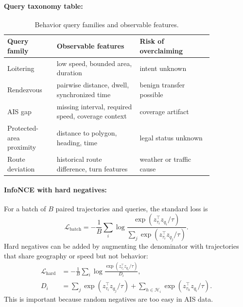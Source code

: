 \documentclass{article}
\begin{document}
\paragraph{Query taxonomy table:}

\begin{table}[t]
\centering
\caption{Behavior query families and observable features.}
\begin{tabular}{@{}p{0.20\linewidth}p{0.34\linewidth}p{0.30\linewidth}@{}}
\toprule
\textbf{Query family} & \textbf{Observable features} & \textbf{Risk of overclaiming}\\
\midrule
Loitering & low speed, bounded area, duration & intent unknown\\
Rendezvous & pairwise distance, dwell, synchronized time & benign transfer possible\\
AIS gap & missing interval, required speed, coverage context & coverage artifact\\
Protected-area proximity & distance to polygon, heading, time & legal status unknown\\
Route deviation & historical route difference, turn features & weather or traffic cause\\
\bottomrule
\end{tabular}
\end{table}

\paragraph{InfoNCE with hard negatives:}

For a batch of $B$ paired trajectories and queries, the standard loss is
\begin{equation}
  \mathcal{L}_{\text{batch}}=-\frac{1}{B}\sum_i\log
  \frac{\exp(z_{\tau_i}^{\top}z_{q_i}/\tau)}
  {\sum_j\exp(z_{\tau_i}^{\top}z_{q_j}/\tau)}.
\end{equation}
Hard negatives can be added by augmenting the denominator with trajectories that share geography or speed but not behavior:
\begin{equation}
\begin{aligned}
\mathcal{L}_{\text{hard}}
&=-\frac{1}{B}\sum_i\log
\frac{\exp(z_{\tau_i}^{\top}z_{q_i}/\tau)}{D_i},\\
D_i&=\sum_j\exp(z_{\tau_i}^{\top}z_{q_j}/\tau)
+\sum_{h\in \mathcal{H}_i}\exp(z_{\tau_h}^{\top}z_{q_i}/\tau).
\end{aligned}
\end{equation}
This is important because random negatives are too easy in AIS data.
\end{document}
